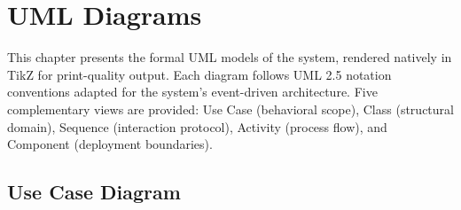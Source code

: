 \documentclass[12pt,a4paper,twoside]{report}
\begin{document}
\chapter{UML Diagrams}

This chapter presents the formal UML models of the system, rendered natively in TikZ for print-quality output. Each diagram follows UML 2.5 notation conventions adapted for the system's event-driven architecture. Five complementary views are provided: Use Case (behavioral scope), Class (structural domain), Sequence (interaction protocol), Activity (process flow), and Component (deployment boundaries).

\section{Use Case Diagram}
\end{document}
